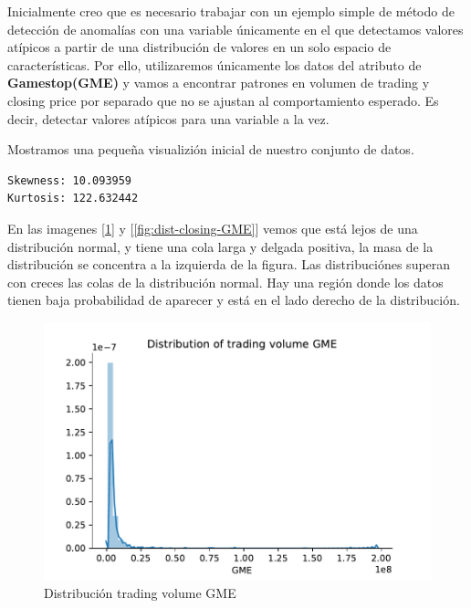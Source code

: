 \documentclass[12pt,twoside]{report}
\begin{document}
Inicialmente creo que es necesario trabajar con un ejemplo simple de método de detección de anomalías con una variable únicamente en el que detectamos valores atípicos a partir de una distribución de valores en un solo espacio de características. Por ello, utilizaremos únicamente los datos del atributo de \textbf{Gamestop(GME)} y vamos a encontrar patrones en volumen de trading y closing price por separado que no se ajustan al comportamiento esperado. Es decir, detectar valores atípicos para una variable a la vez.

Mostramos una pequeña visualizión inicial de nuestro conjunto de datos.

\begin{lstlisting}
Skewness: 10.093959
Kurtosis: 122.632442
\end{lstlisting}

En las imagenes [\ref{fig:dist-trading-GME}] y [\ref{fig:dist-closing-GME}] vemos que está lejos de una distribución normal, y tiene una cola larga y delgada positiva, la masa de la distribución se concentra a la izquierda de la figura. Las distribuciónes superan con creces las colas de la distribución normal.
Hay una región donde los datos tienen baja probabilidad de aparecer y está en el lado derecho de la distribución.

\begin{figure}[H]
\includegraphics[width=\textwidth]{../code/figures/distribution_trading_volume_GME.pdf}
\centering
\caption{Distribución trading volume GME}
\label{fig:dist-trading-GME}
\end{figure}
\end{document}
